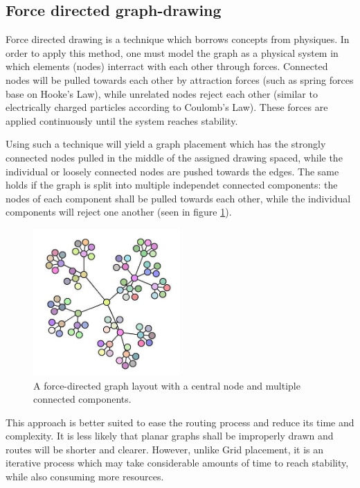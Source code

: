 \subsection{Force directed graph-drawing}

Force directed drawing\cite{fruchterman1991graph} is a technique which borrows concepts from physiques. In order to apply this method, one must model the graph as a 
physical system in which elements (nodes) interract with each other through forces. Connected nodes will be pulled towards each other by 
attraction forces (such as spring forces base on Hooke's Law), while unrelated nodes reject each other (similar to electrically charged particles
according to Coulomb's Law). These forces are applied continuously until the system reaches stability.

Using such a technique will yield a graph placement which has the strongly connected nodes pulled in the middle of the assigned drawing spaced, while the 
individual or loosely connected nodes are pushed towards the edges. The same holds if the graph is split into multiple independet connected components: 
the nodes of each component shall be pulled towards each other, while the individual components will reject one another (seen in figure \ref{force}).

\begin{figure}[ht] \centering
\includegraphics[width=0.5\textwidth]{img/algdesing/force_directed_example.jpg}
\caption{A force-directed graph layout with a central node and multiple connected components.\protect\footnotemark \label{force}} \end{figure}

This approach is better suited to ease the routing process and reduce its time and complexity. It is less likely that planar graphs shall be 
improperly drawn and routes will be shorter and clearer. However, unlike Grid placement, it is an iterative process which may take considerable 
amounts of time to reach stability, while also consuming more resources.

